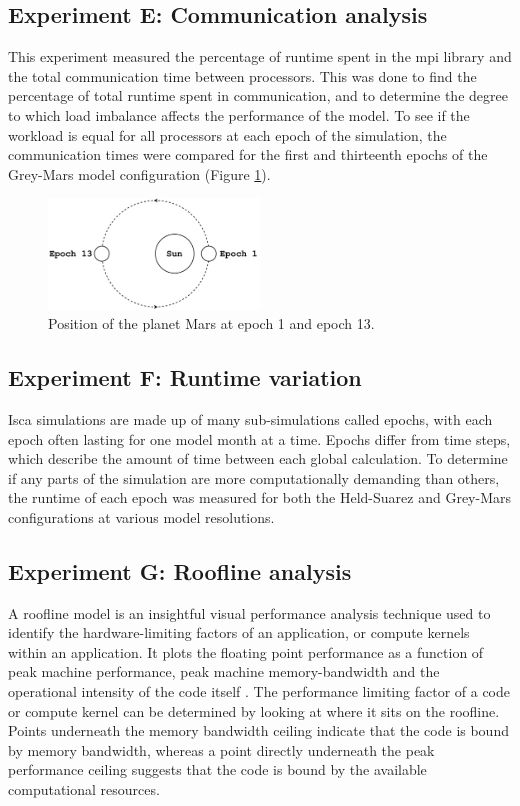 \documentclass[a4paper,11pt]{report}
\begin{document}
\subsection{Experiment E: Communication analysis}
This experiment measured the percentage of runtime spent in the \gls{mpi} library and the total communication time between processors. This was done to find the percentage of total runtime spent in communication, and to determine the degree to which load imbalance affects the performance of the model. To see if the workload is equal for all processors at each epoch of the simulation, the communication times were compared for the first and thirteenth epochs of the Grey-Mars model configuration (Figure \ref{fig:orbits}). 
\begin{figure}[H]
\begin{center}
\includegraphics[width=0.5\textwidth]{img/orbit.pdf}
\caption{Position of the planet Mars at epoch 1 and epoch 13.}
\label{fig:orbits}
\end{center}
\end{figure}


\subsection{Experiment F: Runtime variation}
Isca simulations are made up of many sub-simulations called epochs, with each epoch often lasting for one model month at a time. Epochs differ from time steps, which describe the amount of time between each global calculation. To determine if any parts of the simulation are more computationally demanding than others, the runtime of each epoch was measured for both the Held-Suarez and Grey-Mars configurations at various model resolutions. 

\subsection{Experiment G: Roofline analysis}
A roofline model is an insightful visual performance analysis technique used to identify the hardware-limiting factors of an application, or compute kernels within an application. It plots the floating point performance as a function of peak machine performance, peak machine memory-bandwidth and the operational intensity of the code itself \cite{williams2009roofline}. The performance limiting factor of a code or compute kernel can be determined by looking at where it sits on the roofline. Points underneath the memory bandwidth ceiling indicate that the code is bound by memory bandwidth, whereas a point directly underneath the peak performance ceiling suggests that the code is bound by the available computational resources.
\end{document}
